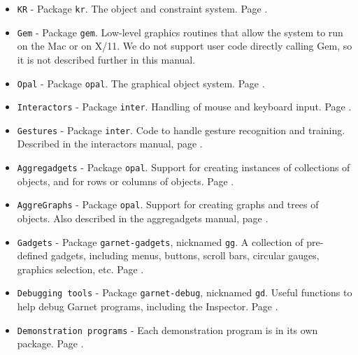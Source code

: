 \documentclass{report}
\begin{document}
\begin{itemize}
\item \texttt{KR} - Package \texttt{kr}.  The object and
  constraint system.  Page \pageref{kr}.
  
\item \texttt{Gem} - Package \texttt{gem}.   Low-level
  graphics routines that allow the system to run on the Mac or on
  X/11.  We do not support user code directly calling Gem, so it is
  not described further in this manual.
  
\item \texttt{Opal} - Package \texttt{opal}.  The
  graphical object system.  Page \pageref{Opal}.
  
\item \texttt{Interactors} - Package \texttt{inter}. 
  Handling of mouse and keyboard input.  Page \pageref{Inter}.
  
\item \texttt{Gestures} - Package \texttt{inter}.  Code to handle gesture
  recognition and training.  Described in the interactors manual, page
  \pageref{Inter}.
  
\item \texttt{Aggregadgets} - Package \texttt{opal}.  Support for creating
  instances of collections of objects, and for rows or columns of
  objects.  Page \pageref{aggregadgets}.
  
\item \texttt{AggreGraphs} - Package \texttt{opal}.  Support for creating
  graphs and trees of objects.  Also described in the aggregadgets
  manual, page \pageref{aggregadgets}.
  
\item \texttt{Gadgets} - Package \texttt{garnet-gadgets}, nicknamed \texttt{gg}.
   A collection of pre-defined
  gadgets, including menus, buttons, scroll bars, circular gauges,
  graphics selection, etc.  Page \pageref{gadgets}.
  
\item \texttt{Debugging tools} - Package \texttt{garnet-debug}, nicknamed
  \texttt{gd}.   Useful functions to help
  debug Garnet programs, including the Inspector.  Page \pageref{Debug}.
  
\item \texttt{Demonstration programs} - Each demonstration program is in
  its own package.  Page \pageref{demos}.
  

\end{itemize}
\end{document}
